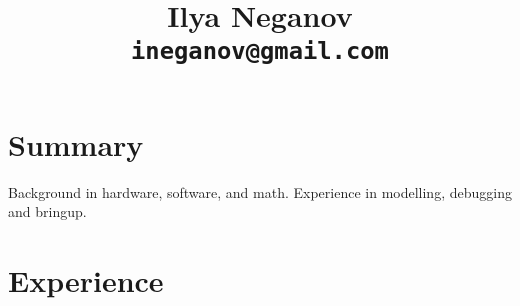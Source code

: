\documentclass[a4paper]{scrartcl}
\begin{document}
\title{Ilya Neganov \\
 \tt{ineganov@gmail.com}}

%
%


%
%
\vspace*{10pt}

\section*{Summary}
 \begin{list1}
   \item Background in hardware, software, and math. Experience in modelling, debugging and bringup.
 \end{list1}

\vspace{10pt}

\section*{Experience}

\vspace{10pt}
\end{document}
